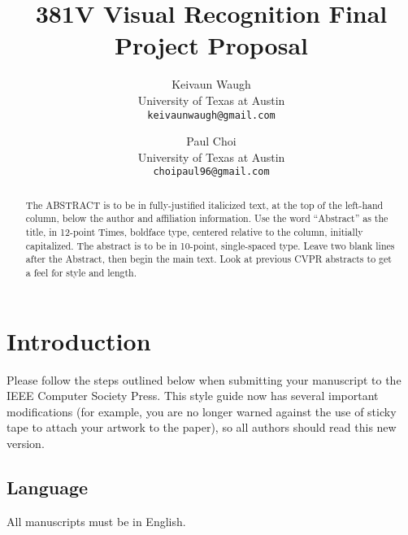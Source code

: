 \documentclass[10pt,twocolumn,letterpaper]{article}
\begin{document}
\title{381V Visual Recognition Final Project Proposal}

\author{Keivaun Waugh\\
University of Texas at Austin\\
{\tt\small keivaunwaugh@gmail.com}
\and
Paul Choi\\
University of Texas at Austin\\
{\tt\small choipaul96@gmail.com}
}

\maketitle

\begin{abstract}
   The ABSTRACT is to be in fully-justified italicized text, at the top
   of the left-hand column, below the author and affiliation
   information. Use the word ``Abstract'' as the title, in 12-point
   Times, boldface type, centered relative to the column, initially
   capitalized. The abstract is to be in 10-point, single-spaced type.
   Leave two blank lines after the Abstract, then begin the main text.
   Look at previous CVPR abstracts to get a feel for style and length.
\end{abstract}

\section{Introduction}

Please follow the steps outlined below when submitting your manuscript to
the IEEE Computer Society Press.  This style guide now has several
important modifications (for example, you are no longer warned against the
use of sticky tape to attach your artwork to the paper), so all authors
should read this new version.

\subsection{Language}

All manuscripts must be in English.
\end{document}
